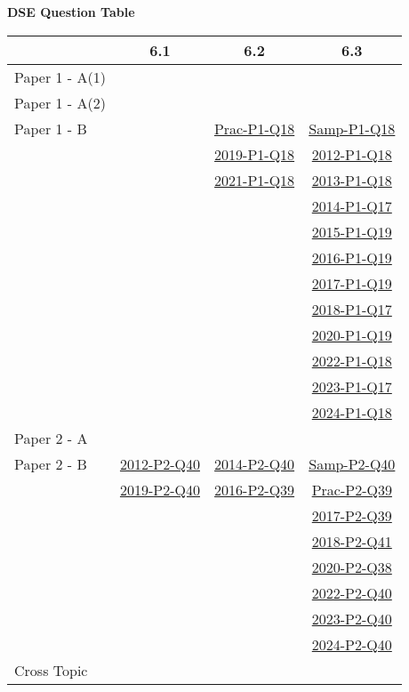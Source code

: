 \documentclass[12pt, a4paper]{article}
\begin{document}
\begin{absolutelynopagebreak}
\begin{center}
\textbf{DSE Question Table}
\end{center}
\begin{center}
\begin{tabular}{|l|c|c|c|}
\hline
        & 6.1 & 6.2 & 6.3 \\\hline
\hline
Paper 1 - A(1)&  &  &  \\
\hline
Paper 1 - A(2)&  &  &  \\
\hline
Paper 1 - B&  & \hyperref[DSE2012P-CoreP1-Q18]{Prac-P1-Q18} & \hyperref[DSE2012S-CoreP1-Q18]{Samp-P1-Q18} \\
&  & \hyperref[DSE2019-CoreP1-Q18]{2019-P1-Q18} & \hyperref[DSE2012-CoreP1-Q18]{2012-P1-Q18} \\
&  & \hyperref[DSE2021-CoreP1-Q18]{2021-P1-Q18} & \hyperref[DSE2013-CoreP1-Q18]{2013-P1-Q18} \\
&  &  & \hyperref[DSE2014-CoreP1-Q17]{2014-P1-Q17} \\
&  &  & \hyperref[DSE2015-CoreP1-Q19]{2015-P1-Q19} \\
&  &  & \hyperref[DSE2016-CoreP1-Q19]{2016-P1-Q19} \\
&  &  & \hyperref[DSE2017-CoreP1-Q19]{2017-P1-Q19} \\
&  &  & \hyperref[DSE2018-CoreP1-Q17]{2018-P1-Q17} \\
&  &  & \hyperref[DSE2020-CoreP1-Q19]{2020-P1-Q19} \\
&  &  & \hyperref[DSE2022-CoreP1-Q18]{2022-P1-Q18} \\
&  &  & \hyperref[DSE2023-CoreP1-Q17]{2023-P1-Q17} \\
&  &  & \hyperref[DSE2024-CoreP1-Q18]{2024-P1-Q18} \\
\hline
\hline
Paper 2 - A&  &  &  \\
\hline
Paper 2 - B& \hyperref[DSE2012-CoreP2-Q40]{2012-P2-Q40} & \hyperref[DSE2014-CoreP2-Q40]{2014-P2-Q40} & \hyperref[DSE2012S-CoreP2-Q40]{Samp-P2-Q40} \\
& \hyperref[DSE2019-CoreP2-Q40]{2019-P2-Q40} & \hyperref[DSE2016-CoreP2-Q39]{2016-P2-Q39} & \hyperref[DSE2012P-CoreP2-Q39]{Prac-P2-Q39} \\
&  &  & \hyperref[DSE2017-CoreP2-Q39]{2017-P2-Q39} \\
&  &  & \hyperref[DSE2018-CoreP2-Q41]{2018-P2-Q41} \\
&  &  & \hyperref[DSE2020-CoreP2-Q38]{2020-P2-Q38} \\
&  &  & \hyperref[DSE2022-CoreP2-Q40]{2022-P2-Q40} \\
&  &  & \hyperref[DSE2023-CoreP2-Q40]{2023-P2-Q40} \\
&  &  & \hyperref[DSE2024-CoreP2-Q40]{2024-P2-Q40} \\
\hline
\hline
Cross Topic&  &  &  \\
\hline
\end{tabular}
\end{center}
\end{absolutelynopagebreak}
\end{document}
